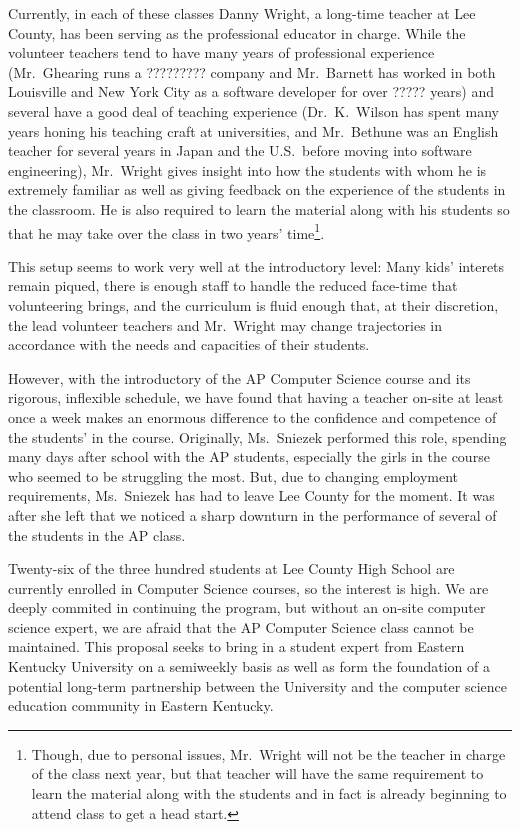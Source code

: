 Currently, in each of these classes Danny Wright, a long-time teacher at Lee
County, has been serving as the professional educator in charge. While the
volunteer teachers tend to have many years of professional experience
(Mr.~Ghearing runs a ????????? company and Mr.~Barnett has worked in both
Louisville and New York City as a software developer for over ????? years)
and several have a good deal of teaching experience (Dr.~K.~Wilson has spent
many years honing his teaching craft at universities, and Mr.~Bethune was an
English teacher for several years in Japan and the U.S.~before moving into
software engineering), Mr.~Wright gives insight into how the students with whom
he is extremely familiar as well as giving feedback on the experience of the
students in the classroom. He is also required to learn the material along with
his students so that he may take over the class in two years' time\footnote{
Though, due to personal issues, Mr.~Wright will not be the teacher in charge
of the class next year, but that teacher will have the same requirement to
learn the material along with the students and in fact is already beginning to
attend class to get a head start.}.

This setup seems to work very well at the introductory level: Many kids'
interets remain piqued, there is enough staff to handle the reduced face-time
that volunteering brings, and the curriculum is fluid enough that, at their
discretion, the lead volunteer teachers and Mr.~Wright may change trajectories
in accordance with the needs and capacities of their students.

However, with the introductory of the AP Computer Science course and its
rigorous, inflexible schedule, we have found that having a teacher on-site
at least once a week makes an enormous difference to the confidence and
competence of the students' in the course. Originally, Ms.~Sniezek performed
this role, spending many days after school with the AP students, especially
the girls in the course who seemed to be struggling the most. But, due to
changing employment requirements, Ms.~Sniezek has had to leave Lee County for
the moment. It was after she left that we noticed a sharp downturn in the
performance of several of the students in the AP class.

Twenty-six of the three hundred students at Lee County High School are currently
enrolled in Computer Science courses, so the interest is high. We are deeply
commited in continuing the program, but without an on-site computer science
expert, we are afraid that the AP Computer Science class cannot be maintained.
This proposal seeks to bring in a student expert from Eastern Kentucky
University on a semiweekly basis as well as form the foundation of a potential
long-term partnership between the University and the computer science education
community in Eastern Kentucky.
